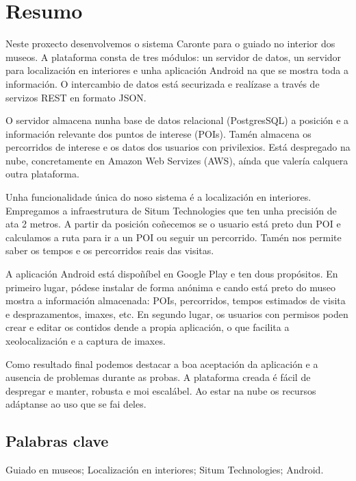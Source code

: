 \chapter*{Resumo}

Neste proxecto desenvolvemos o sistema Caronte para o guiado no interior dos museos. A plataforma consta de tres módulos: un servidor de datos, un servidor para localización en interiores e unha aplicación Android na que se mostra toda a información. O intercambio de datos está securizada e realízase a través de servizos REST en formato JSON.

O servidor almacena nunha base de datos relacional (PostgresSQL) a posición e a información relevante dos puntos de interese (POIs). Tamén almacena os percorridos de interese e os datos dos usuarios con privilexios. Está despregado na nube, concretamente en Amazon Web Servizes (AWS), aínda que valería calquera outra plataforma. 

Unha funcionalidade única do noso sistema é a localización en interiores. Empregamos a infraestrutura de Situm Technologies que ten unha precisión de ata 2 metros. A partir da posición coñecemos se o usuario está preto dun POI e calculamos a ruta para ir a un POI ou seguir un percorrido. Tamén nos permite saber os tempos e os percorridos reais das visitas.

A aplicación Android está dispoñíbel en Google Play e ten dous propósitos. En primeiro lugar, pódese instalar de forma anónima e cando está preto do museo mostra a información almacenada: POIs, percorridos, tempos estimados de visita e desprazamentos, imaxes, etc. En segundo lugar, os usuarios con permisos poden crear e editar os contidos dende a propia aplicación, o que facilita a xeolocalización e a captura de imaxes.

Como resultado final podemos destacar a boa aceptación da aplicación e a ausencia de problemas durante as probas. A plataforma creada é fácil de despregar e manter, robusta e moi escalábel. Ao estar na nube os recursos adáptanse ao uso que se fai deles. 

\section*{Palabras clave}

Guiado en museos; Localización en interiores; Situm Technologies; Android.
